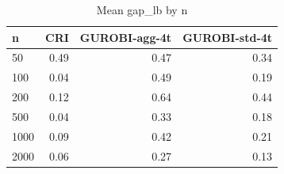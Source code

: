 \begin{table}[htbp]
\centering
\small
\caption{Mean gap\_lb by n}
\label{tab:E7_gurobi_threads_b60_by_n}
\begin{tabular}{lrrr}
\toprule
n & CRI & GUROBI-agg-4t & GUROBI-std-4t \\
\midrule
50 & 0.49 & 0.47 & 0.34 \\
100 & 0.04 & 0.49 & 0.19 \\
200 & 0.12 & 0.64 & 0.44 \\
500 & 0.04 & 0.33 & 0.18 \\
1000 & 0.09 & 0.42 & 0.21 \\
2000 & 0.06 & 0.27 & 0.13 \\
\bottomrule
\end{tabular}
\end{table}
